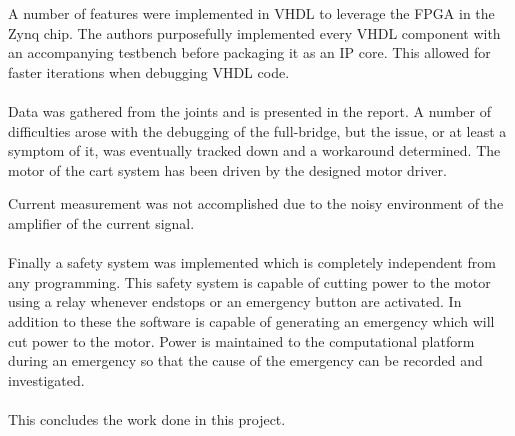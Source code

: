 A number of features were implemented in VHDL to leverage the FPGA in the Zynq chip.
The authors purposefully implemented every VHDL component with an accompanying testbench before packaging it as an IP core.
This allowed for faster iterations when debugging VHDL code.
\\~\\
Data was gathered from the joints and is presented in the report.
A number of difficulties arose with the debugging of the full-bridge, but the issue, or at least a symptom of it, was eventually tracked down and a workaround determined.
The motor of the cart system has been driven by the designed motor driver.

Current measurement was not accomplished due to the noisy environment of the amplifier of the current signal.
\\~\\
Finally a safety system was implemented which is completely independent from any programming.
This safety system is capable of cutting power to the motor using a relay whenever endstops or an emergency button are activated.
In addition to these the software is capable of generating an emergency which will cut power to the motor.
Power is maintained to the computational platform during an emergency so that the cause of the emergency can be recorded and investigated.
\\~\\
This concludes the work done in this project.